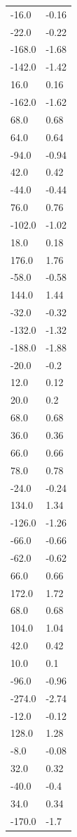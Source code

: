 \begin{longtable}{ll}
-16.0 & -0.16 \\
-22.0 & -0.22 \\
-168.0 & -1.68 \\
-142.0 & -1.42 \\
16.0 & 0.16 \\
-162.0 & -1.62 \\
68.0 & 0.68 \\
64.0 & 0.64 \\
-94.0 & -0.94 \\
42.0 & 0.42 \\
-44.0 & -0.44 \\
76.0 & 0.76 \\
-102.0 & -1.02 \\
18.0 & 0.18 \\
176.0 & 1.76 \\
-58.0 & -0.58 \\
144.0 & 1.44 \\
-32.0 & -0.32 \\
-132.0 & -1.32 \\
-188.0 & -1.88 \\
-20.0 & -0.2 \\
12.0 & 0.12 \\
20.0 & 0.2 \\
68.0 & 0.68 \\
36.0 & 0.36 \\
66.0 & 0.66 \\
78.0 & 0.78 \\
-24.0 & -0.24 \\
134.0 & 1.34 \\
-126.0 & -1.26 \\
-66.0 & -0.66 \\
-62.0 & -0.62 \\
66.0 & 0.66 \\
172.0 & 1.72 \\
68.0 & 0.68 \\
104.0 & 1.04 \\
42.0 & 0.42 \\
10.0 & 0.1 \\
-96.0 & -0.96 \\
-274.0 & -2.74 \\
-12.0 & -0.12 \\
128.0 & 1.28 \\
-8.0 & -0.08 \\
32.0 & 0.32 \\
-40.0 & -0.4 \\
34.0 & 0.34 \\
-170.0 & -1.7 \\

\end{longtable}
